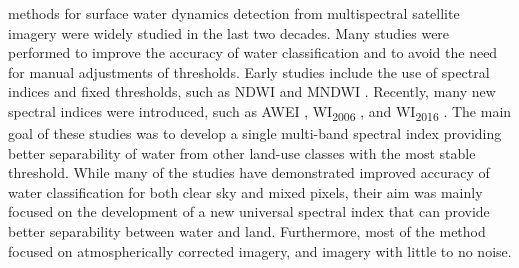  methods for surface water dynamics detection from multispectral satellite imagery were widely studied in the last two decades. Many studies were performed to improve the accuracy of water classification and to avoid the need for manual adjustments of thresholds. Early studies include the use of spectral indices and fixed thresholds, such as NDWI \citet{McFeeters1996} and MNDWI \citet{Xu2006}. Recently, many new spectral indices were introduced, such as AWEI \citet{feyisa2014automated}, WI\textsubscript{2006} \citet{homer2004development}, and WI\textsubscript{2016} \citet{fisher2016comparing}. The main goal of these studies was to develop a single multi-band spectral index providing better separability of water from other land-use classes with the most stable threshold.  While many of the studies have demonstrated improved accuracy of water classification for both clear sky and mixed pixels, their aim was mainly focused on the development of a new universal spectral index that can provide better separability between water and land. Furthermore, most of the method focused on atmospherically corrected imagery, and imagery with little to no noise. 

